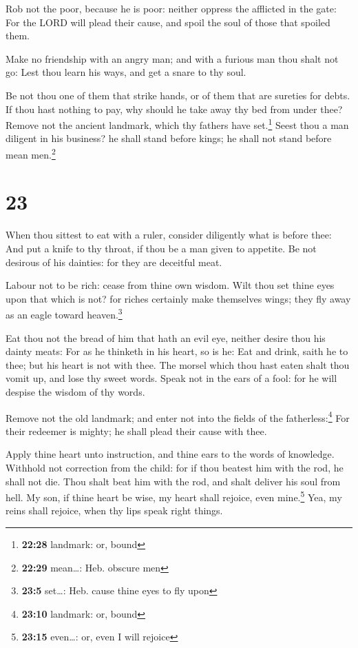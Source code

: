  Rob not the poor, because he is poor: neither oppress
the afflicted in the gate:  For the LORD will plead their
cause, and spoil the soul of those that spoiled them.

 Make no friendship with an angry man; and with a furious
man thou shalt not go:  Lest thou learn his ways, and get
a snare to thy soul.

 Be not thou one of them that strike hands, or of them
that are sureties for debts.  If thou hast nothing to
pay, why should he take away thy bed from under thee? 
Remove not the ancient landmark, which thy fathers have set.\footnote{\textbf{22:28}
  landmark: or, bound}  Seest thou a man diligent in his
business? he shall stand before kings; he shall not stand before mean
men.\footnote{\textbf{22:29} mean\ldots: Heb. obscure men}

\hypertarget{section-22}{%
\section{23}\label{section-22}}

 When thou sittest to eat with a ruler, consider
diligently what is before thee:  And put a knife to thy
throat, if thou be a man given to appetite.  Be not
desirous of his dainties: for they are deceitful meat.

 Labour not to be rich: cease from thine own wisdom.
 Wilt thou set thine eyes upon that which is not? for
riches certainly make themselves wings; they fly away as an eagle toward
heaven.\footnote{\textbf{23:5} set\ldots: Heb. cause thine eyes to fly
  upon}

 Eat thou not the bread of him that hath an evil eye,
neither desire thou his dainty meats:  For as he thinketh
in his heart, so is he: Eat and drink, saith he to thee; but his heart
is not with thee.  The morsel which thou hast eaten shalt
thou vomit up, and lose thy sweet words.  Speak not in the
ears of a fool: for he will despise the wisdom of thy words.

 Remove not the old landmark; and enter not into the
fields of the fatherless:\footnote{\textbf{23:10} landmark: or, bound}
 For their redeemer is mighty; he shall plead their cause
with thee.

 Apply thine heart unto instruction, and thine ears to
the words of knowledge.  Withhold not correction from the
child: for if thou beatest him with the rod, he shall not die.
 Thou shalt beat him with the rod, and shalt deliver his
soul from hell.  My son, if thine heart be wise, my heart
shall rejoice, even mine.\footnote{\textbf{23:15} even\ldots: or, even I
  will rejoice}  Yea, my reins shall rejoice, when thy
lips speak right things.

